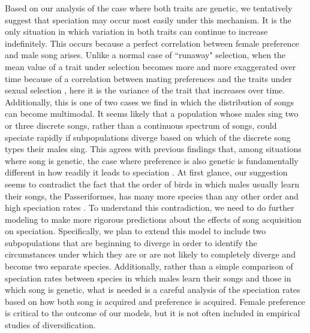 \documentclass[12pt]{article}
\begin{document}
Based on our analysis of the case where both traits are genetic, we tentatively suggest that speciation may occur most easily under this mechanism. It is the only situation in which variation in both traits can continue to increase indefinitely. This occurs because a perfect correlation between female preference and male song arises. Unlike a normal case of ``runaway" selection, when the mean value of a trait under selection becomes more and more exaggerated over time because of a correlation between mating preferences and the traits under sexual selection \cite{Lande:1981fk,Doorn:2000nx,Aoki:2001ly,Mead:2004uq}, here it is the variance of the trait that increases over time. Additionally, this is one of two cases we find in which the distribution of songs can become multimodal. It seems likely that a population whose males sing two or three discrete songs, rather than a continuous spectrum of songs, could speciate rapidly if subpopulations diverge based on which of the discrete song types their males sing. This agrees with previous findings that, among situations where song is genetic, the case where preference is also genetic is fundamentally different in how readily it leads to speciation \cite{Verzijden:2005vn,Gilman:2015fk}. At first glance, our suggestion seems to contradict the fact that the order of birds in which males usually learn their songs, the Passeriformes, has many more species than any other order \cite{Wilkins:2012ve,Lachlan:2004tg} and high  speciation rates \cite{Jetz:2013fv}. To understand this contradiction, we need to do further modeling to make more rigorous predictions about the effects of song acquisition on speciation. Specifically, we plan to extend this model to include two subpopulations that are beginning to diverge in order to identify the circumstances under which they are or are not likely to completely diverge and become two separate species. Additionally, rather than a simple comparison of speciation rates between species in which males learn their songs and those in which song is genetic, what is needed is a careful analysis of the speciation rates based on how both song is acquired and preference is acquired. Female preference is critical to the outcome of our models, but it is not often included in empirical studies of diversification.
\end{document}
